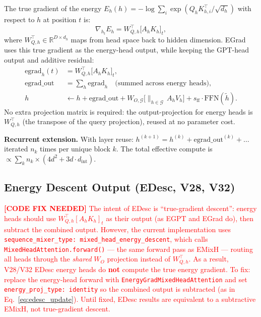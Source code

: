The true gradient of the energy $E_h(h) = -\log \sum_i \exp(Q_h K_{h,i}^\top / \sqrt{d_h})$
with respect to $h$ at position $t$ is:
\begin{equation}
  \nabla_{h_t} E_h = W_{Q,h}^\top \bigl[ A_h K_h \bigr]_t, \label{eq:egrad}
\end{equation}
where $W_{Q,h}^\top \in \mathbb{R}^{D \times d_h}$ maps from head space back to
hidden dimension.
EGrad uses this true gradient as the energy-head output, while keeping the GPT-head
output and additive residual:
\begin{align}
  \mathrm{egrad}_h(t) &= W_{Q,h}^\top \bigl[ A_h K_h \bigr]_t, \\
  \mathrm{egrad\_out} &= \sum_h \mathrm{egrad}_h \quad \text{(summed across energy heads)}, \\
  h &\leftarrow h + \mathrm{egrad\_out} + W_{O,\mathcal{G}} \bigl[ \|_{h \in \mathcal{G}}\, A_h V_h \bigr]
       + s_{\mathrm{ff}} \cdot \mathrm{FFN}(\tilde{h}). \label{eq:egrad_update}
\end{align}
No extra projection matrix is required: the output-projection for energy heads is
$W_{Q,h}^\top$ (the transpose of the query projection), reused at no parameter cost.

\textbf{Recurrent extension.}
With layer reuse: $h^{(k+1)} = h^{(k)} + \mathrm{egrad\_out}^{(k)} + \ldots$ iterated
$n_k$ times per unique block $k$.  The total effective compute is
$\propto \sum_k n_k \times (4d^2 + 3d \cdot d_{\mathrm{int}})$.

\subsection{Energy Descent Output (EDesc, V28, V32)}

\textcolor{red}{\textbf{[CODE FIX NEEDED]}\;
The intent of EDesc is ``true-gradient descent'': energy heads should use
$W_{Q,h}^\top [A_h K_h]_t$ as their output (as EGPT and EGrad do), then subtract
the combined output.
However, the current implementation uses \texttt{sequence\_mixer\_type: mixed\_head\_energy\_descent},
which calls \texttt{MixedHeadAttention.forward()} — the same forward pass as EMixH —
routing all heads through the \emph{shared} $W_O$ projection instead of $W_{Q,h}^\top$.
As a result, V28/V32 EDesc energy heads do \textbf{not} compute the true energy gradient.
To fix: replace the energy-head forward with \texttt{EnergyGradMixedHeadAttention} and set
\texttt{energy\_proj\_type: identity} so the combined output is subtracted
(as in Eq.~\ref{eq:edesc_update}).
Until fixed, EDesc results are equivalent to a subtractive EMixH, not true-gradient descent.}

